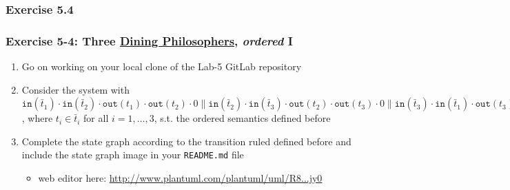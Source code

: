 \documentclass[handout]{beamer}\mode<presentation>{\usetheme{AMSCesenaBleu}}
\begin{document}
\subsubsection{Exercise 5.4}

\begin{frame}
\frametitle{Exercise 5-4: Three \href{https://en.wikipedia.org/wiki/Dining_philosophers_problem}{Dining Philosophers}, \emph{ordered} I}
    \begin{enumerate}
        \item Go on working on your local clone of the Lab-5 GitLab repository
        
        \vfill
        
        \item Consider the system with \alert{$\mathtt{in}(\bar{t}_1) \cdot \mathtt{in}(\bar{t}_2) \cdot \mathtt{out}(t_1) \cdot \mathtt{out}(t_2) \cdot 0 \parallel \mathtt{in}(\bar{t}_2) \cdot \mathtt{in}(\bar{t}_3) \cdot \mathtt{out}(t_2) \cdot \mathtt{out}(t_3) \cdot 0 \parallel \mathtt{in}(\bar{t}_3) \cdot \mathtt{in}(\bar{t}_1) \cdot \mathtt{out}(t_3) \cdot \mathtt{out}(t_1) \cdot 0 \parallel t_1 \cup t_2 \cup t_3$}, where $t_i \in \bar{t}_i$ for all $i = 1,\ldots,3$, s.t. the \alert{ordered} \linda{} semantics defined before
        
        \vfill
    
        \item Complete the state graph according to the transition ruled defined before and include the state graph image in your \alert{\texttt{README.md}} file
        \begin{itemize}
            \item web editor here: \href{
                http://www.plantuml.com/plantuml/uml/R8-nJiCm441tVyMDBLAhq15L4Q85YQLBnTHsiEAZM77ioBu00J4qOU17MFWMlg9VWXDgPAHiJtVlMRvBHznILIZcSgbBRda1IxpdbQ8ResajNn1cIRHS4oViLrGh14bSoSmDrojU82nCPILQzY050XObrI3GPLQM98rcKUcwf-6L0LpnBDzRKscnCChO-VnQ2wdtQGf6oKSSCfR8XJ9PxXsBOiYuq_XSUaBXdHgLCa_iZR7DsGucanHSmleFUBW0gKVq_Nvi3kDfm6OyDHMDo0y3TRDagm6E7vyGUG7RI0pKdfB_KHkYwFKeFuJeb7KZ3ryTD05QvfBVIyxx0_fkgpUtAm-xl-NifncpnuaO1g9mdrFu2F6_dOeRq4191otDtc0ZxasapDDujICB0ybEGVK4-kRDUxO9n2l4AuiUuWfnVPlWYpMBKUf6QuBTHmdjd301OfHCW9Xw9ZZpXtGS7mcOuFPHifG4YELkpYkBjMU2D-TNPBWNqyLJ7MRH1QXMp09KT_Exy056XCq8BJsWpGS2zo3RoPzVN_QneOVUWkDerO-VAn9t55CBjTlTXAaKP9KYceWxYwSLr29555DbVRlAn5sbNK5rSszNvNT7p767wtGfn2rVhr3TmX3eNREjUlJzCJvN9N8lpWKrI2g_3MPztR9uyKIfN2odNhkirRSmQubSlDvPBYmBhpbtuYN-quqv8g_2IbZsyy9_4HrRspHwS_lUNuoY5_lAd47cV5Hnjf-lniLuH_V0OnXqW4k6_-aRGJl3kAnnhO0hYeshYXFdPht6EQlPE2V03TyxXtq_QLpq-ZOCjD3tyByv1-CN5HzuBYdkRTQRkA8wSLKX7U3yBC2T-j3kVoATdZu-txTl_jy0
            }{http://www.plantuml.com/plantuml/uml/R8...jy0}
        \end{itemize}
        

\end{enumerate}
\end{frame}
\end{document}

